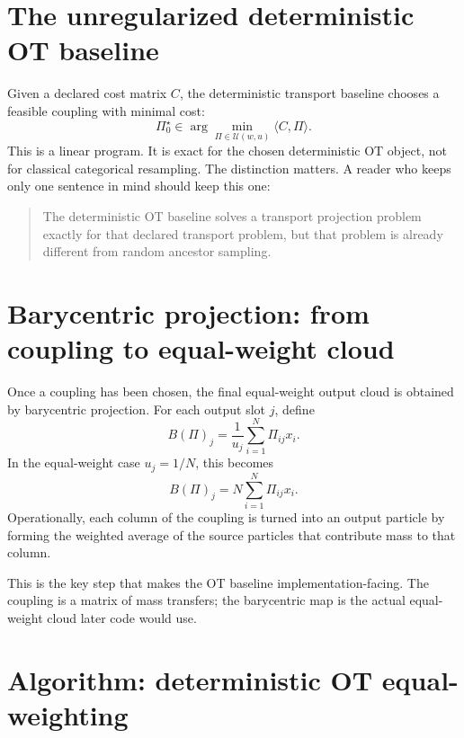 \section{The unregularized deterministic OT baseline}
\label{sec:bf-ot-baseline-unregularized}

Given a declared cost matrix \(C\), the deterministic transport baseline chooses a
feasible coupling with minimal cost:
\begin{equation}
\label{eq:bf-ot-baseline-lp}
  \Pi_0^\star
  \in
  \arg\min_{\Pi\in\mathcal U(w,u)}
  \langle C,\Pi\rangle.
\end{equation}
This is a linear program.  It is exact for the chosen deterministic OT object,
not for classical categorical resampling.  The distinction matters.  A reader who
keeps only one sentence in mind should keep this one:

\begin{quote}
The deterministic OT baseline solves a transport projection problem exactly for
that declared transport problem, but that problem is already different from
random ancestor sampling.
\end{quote}

\section{Barycentric projection: from coupling to equal-weight cloud}
\label{sec:bf-ot-baseline-barycentric}

Once a coupling has been chosen, the final equal-weight output cloud is obtained
by barycentric projection.  For each output slot \(j\), define
\begin{equation}
\label{eq:bf-ot-baseline-barycentric}
  B(\Pi)_j
  =
  \frac{1}{u_j}
  \sum_{i=1}^N \Pi_{ij}x_i.
\end{equation}
In the equal-weight case \(u_j=1/N\), this becomes
\begin{equation}
\label{eq:bf-ot-baseline-barycentric-equal}
  B(\Pi)_j
  =
  N\sum_{i=1}^N \Pi_{ij}x_i.
\end{equation}
Operationally, each column of the coupling is turned into an output particle by
forming the weighted average of the source particles that contribute mass to that
column.

This is the key step that makes the OT baseline implementation-facing.  The
coupling is a matrix of mass transfers; the barycentric map is the actual equal-
weight cloud later code would use.

\section{Algorithm: deterministic OT equal-weighting}
\label{sec:bf-ot-baseline-algorithm}

